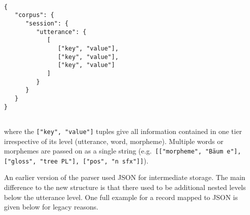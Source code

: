 \documentclass[a4paper, 11pt]{book}
\begin{document}
\begin{verbatim}

{
   "corpus": {
      "session": {
         "utterance": {
            [
               ["key", "value"], 
               ["key", "value"],
               ["key", "value"]
            ]
         }
      }
   }
}
	
\end{verbatim}

where the \texttt{["key", "value"]} tuples give all information contained in one tier irrespective of its level (utterance, word, morpheme). Multiple words or morphemes are passed on as a single string (e.g.\ \texttt{[["morpheme", "Bäum e"], ["gloss", "tree PL"], ["pos", "n sfx"]]}). 

%

An earlier version of the parser used JSON for intermediate storage. The main difference to the new structure is that there used to be additional nested levels below the utterance level. One full example for a record mapped to JSON is given below for legacy reasons. 

\end{document}
